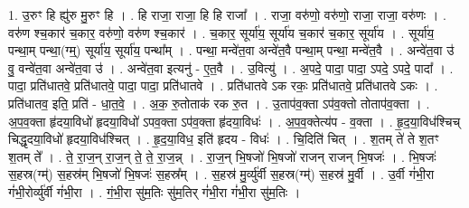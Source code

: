 \documentclass[17pt]{extarticle}
\begin{document}
1. उ॒रुꣳ हि ह्यु॑रु मु॒रुꣳ हि । . हि राजा॒ राजा॒ हि हि राजा᳚ । . राजा॒ वरु॑णो॒ वरु॑णो॒ राजा॒ राजा॒ वरु॑णः । . वरु॑ण श्च॒कार॑ च॒कार॒ वरु॑णो॒ वरु॑ण श्च॒कार॑ । . च॒कार॒ सूर्या॑य॒ सूर्या॑य च॒कार॑ च॒कार॒ सूर्या॑य । . सूर्या॑य॒ पन्था॒म् पन्था॒(ग्म्॒) सूर्या॑य॒ सूर्या॑य॒ पन्था᳚म् । . पन्था॒ मन्वे॑त॒वा अन्वे॑त॒वै पन्था॒म् पन्था॒ मन्वे॑त॒वै । . अन्वे॑त॒वा उ॑ वु॒ वन्वे॑त॒वा अन्वे॑त॒वा उ॑ । . अन्वे॑त॒वा इत्यनु॑ - ए॒त॒वै । . उ॒वित्यु॑ । . अ॒पदे॒ पादा॒ पादा॒ ऽपदे॒ ऽपदे॒ पादा᳚ । . पादा॒ प्रति॑धातवे॒ प्रति॑धातवे॒ पादा॒ पादा॒ प्रति॑धातवे । . प्रति॑धातवे ऽक रकः॒ प्रति॑धातवे॒ प्रति॑धातवे ऽकः । . प्रति॑धातव॒ इति॒ प्रति॑ - धा॒त॒वे॒ । . अ॒क॒ रु॒तोताक॑ रक रु॒त । . उ॒ताप॑व॒क्ता ऽप॑व॒क्तो तोताप॑व॒क्ता । . अ॒प॒व॒क्ता हृ॑दया॒विधो॑ हृदया॒विधो॑ ऽपव॒क्ता ऽप॑व॒क्ता हृ॑दया॒विधः॑ । . अ॒प॒व॒क्तेत्य॑प - व॒क्ता । . हृ॒द॒या॒विध॑श्चिच् चिद्धृदया॒विधो॑ हृदया॒विध॑श्चित् । . हृ॒द॒या॒विध॒ इति॑ हृदय - विधः॑ । . चि॒दिति॑ चित् । . श॒तम् ते॑ ते श॒तꣳ श॒तम् ते᳚ । . ते॒ रा॒ज॒न् रा॒ज॒न् ते॒ ते॒ रा॒ज॒न्न् । . रा॒ज॒न् भि॒षजो॑ भि॒षजो॑ राजन् राजन् भि॒षजः॑ । . भि॒षजः॑ स॒हस्र(ग्म्॑) स॒हस्र॑म् भि॒षजो॑ भि॒षजः॑ स॒हस्र᳚म् । . स॒हस्र॑ मु॒र्व्यु॑र्वी स॒हस्र(ग्म्॑) स॒हस्र॑ मु॒र्वी । . उ॒र्वी गं॑भी॒रा गं॑भी॒रोर्व्यु॑र्वी गं॑भी॒रा । . गं॒भी॒रा सु॑म॒तिः सु॑म॒तिर् गं॑भी॒रा गं॑भी॒रा सु॑म॒तिः । \newline
\end{document}

